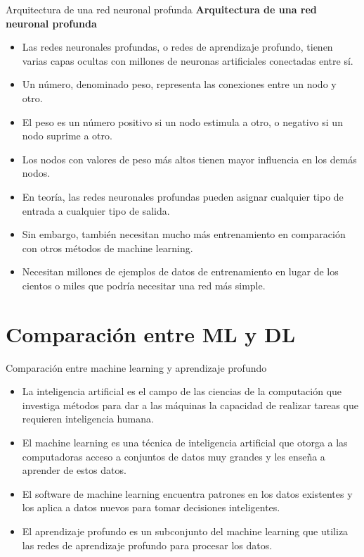 \documentclass[11pt,aspectratio=169]{beamer}
\begin{document}
\begin{frame}{Arquitectura de una red neuronal profunda}
	\textbf{Arquitectura de una red neuronal profunda}
	\begin{itemize}
		\item Las redes neuronales profundas, o redes de aprendizaje profundo, tienen varias capas ocultas con millones 
			de neuronas artificiales conectadas entre sí.\pause
		\item Un número, denominado peso, representa las conexiones entre un nodo y otro.\pause 
		\item El peso es un número positivo si un nodo estimula a otro, o negativo si un nodo suprime a otro.\pause 
		\item Los nodos con valores de peso más altos tienen mayor influencia en los demás nodos.\pause
		\item En teoría, las redes neuronales profundas pueden asignar cualquier tipo de entrada a cualquier tipo de salida. \pause
		\item Sin embargo, también necesitan mucho más entrenamiento en comparación con otros métodos de machine learning. \pause
		\item Necesitan millones de ejemplos de datos de entrenamiento en lugar de los cientos o miles que podría necesitar una 
			red más simple.
	\end{itemize}
\end{frame}

\section{Comparación entre ML y DL}
\begin{frame}{Comparación entre machine learning y aprendizaje profundo}
	\begin{itemize}
		\item La inteligencia artificial es el campo de las ciencias de la computación que investiga métodos para dar a las 
			máquinas la capacidad de realizar tareas que requieren inteligencia humana.\pause 
		\item El machine learning es una técnica de inteligencia artificial que otorga a las computadoras acceso a conjuntos 
			de datos muy grandes y les enseña a aprender de estos datos.\pause
		\item El software de machine learning encuentra patrones en los datos existentes y los aplica a datos nuevos para 
			tomar decisiones inteligentes. \pause 
		\item El aprendizaje profundo es un subconjunto del machine learning que utiliza las redes de aprendizaje profundo 
			para procesar los datos.
	\end{itemize}
\end{frame}
\end{document}
